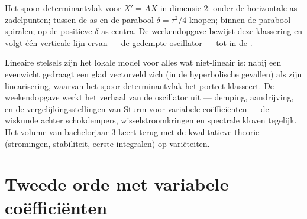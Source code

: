 \begin{omfigure}

{\small Het spoor-determinantvlak voor $X' = AX$ in dimensie $2$:
onder de horizontale as zadelpunten; tussen de as en de parabool
$\delta = \tau^2/4$ knopen; binnen de parabool spiralen; op de
positieve $\delta$-as centra. De weekendopgave bewijst deze
klassering en volgt één verticale lijn ervan --- de gedempte
oscillator --- tot in de .}
\end{omfigure}

\begin{remark}
Lineaire stelsels zijn het lokale model voor alles wat
niet-lineair is: nabij een evenwicht gedraagt een glad
vectorveld zich (in de hyperbolische gevallen) als zijn
linearisering, waarvan het spoor-determinantvlak het portret
klasseert. De weekendopgave werkt het verhaal van de oscillator
 uit --- demping, aandrijving,  en de
vergelijkingsstellingen van Sturm voor variabele coëfficiënten ---
de wiskunde achter schokdempers, wisselstroomkringen en spectrale
kloven tegelijk. Het volume van bachelorjaar 3 keert terug met de
kwalitatieve theorie (stromingen, stabiliteit, eerste integralen)
op variëteiten.
\end{remark}

\section{Tweede orde met variabele coëfficiënten}

